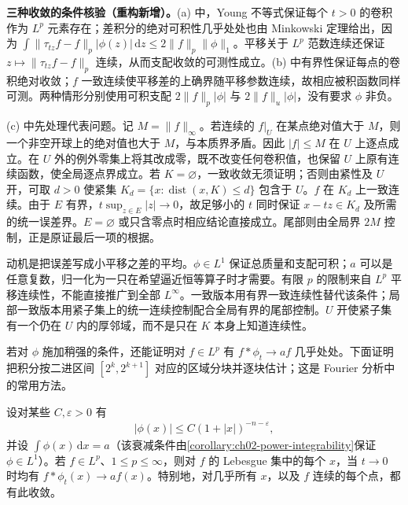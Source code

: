\documentclass[../../main.tex]{subfiles}
\begin{document}
\begin{remark}
\textbf{三种收敛的条件核验（重构新增）。}(a) 中，Young 不等式保证每个 $t>0$ 的卷积作为 $L^p$ 元素存在；差积分的绝对可积性几乎处处也由 Minkowski 定理给出，因为
$\int\|\tau_{tz}f-f\|_p|\phi(z)|\,\mathrm dz\leqslant2\|f\|_p\|\phi\|_1$。平移关于 $L^p$ 范数连续还保证 $z\mapsto\|\tau_{tz}f-f\|_p$ 连续，从而支配收敛的可测性成立。(b) 中有界性保证每点的卷积绝对收敛；$f$ 一致连续使平移差的上确界随平移参数连续，故相应被积函数同样可测。两种情形分别使用可积支配 $2\|f\|_p|\phi|$ 与 $2\|f\|_u|\phi|$，没有要求 $\phi$ 非负。

(c) 中先处理代表问题。记 $M=\|f\|_\infty$。若连续的 $f|_U$ 在某点绝对值大于 $M$，则一个非空开球上的绝对值也大于 $M$，与本质界矛盾。因此 $|f|\leqslant M$ 在 $U$ 上逐点成立。在 $U$ 外的例外零集上将其改成零，既不改变任何卷积值，也保留 $U$ 上原有连续函数，使全局逐点界成立。若 $K=\varnothing$，一致收敛无须证明；否则由紧性及 $U$ 开，可取 $d>0$ 使紧集 $K_d=\{x:\operatorname{dist}(x,K)\leqslant d\}$ 包含于 $U$。$f$ 在 $K_d$ 上一致连续。由于 $E$ 有界，$t\sup_{z\in E}|z|\to0$，故足够小的 $t$ 同时保证 $x-tz\in K_d$ 及所需的统一误差界。$E=\varnothing$ 或只含零点时相应结论直接成立。尾部则由全局界 $2M$ 控制，正是原证最后一项的根据。

动机是把误差写成小平移之差的平均。$\phi\in L^1$ 保证总质量和支配可积；$a$ 可以是任意复数，归一化为一只在希望逼近恒等算子时才需要。有限 $p$ 的限制来自 $L^p$ 平移连续性，不能直接推广到全部 $L^\infty$。一致版本用有界一致连续性替代该条件；局部一致版本用紧子集上的统一连续控制配合全局有界的尾部控制。$U$ 开使紧子集有一个仍在 $U$ 内的厚邻域，而不是只在 $K$ 本身上知道连续性。
\end{remark}
若对 $\phi$ 施加稍强的条件，还能证明对 $f\in L^p$ 有 $f*\phi_t\to af$ 几乎处处。下面证明把积分按二进区间 $[2^k,2^{k+1}]$ 对应的区域分块并逐块估计；这是 Fourier 分析中的常用方法。
\begin{theorem}\label{theorem:ch08-lebesgue-point-convergence}
设对某些 $C,\varepsilon>0$ 有
\begin{align*}
|\phi(x)|\leqslant C(1+|x|)^{-n-\varepsilon},
\end{align*}
并设 $\int\phi(x)\,\mathrm dx=a$（该衰减条件由\cref{corollary:ch02-power-integrability}保证 $\phi\in L^1$）。若 $f\in L^p$、$1\leqslant p\leqslant\infty$，则对 $f$ 的 Lebesgue 集中的每个 $x$，当 $t\to0$ 时均有 $f*\phi_t(x)\to af(x)$。特别地，对几乎所有 $x$，以及 $f$ 连续的每个点，都有此收敛。
\end{theorem}
\end{document}
